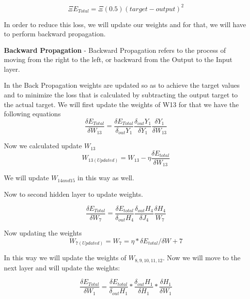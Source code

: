 \begin{equation}
\Xi E_{Total} = \Xi (0.5)(target - output)^2    
\end{equation}

In order to reduce this loss, we will update our weights and for that, we will have to perform backward propagation.

\textbf{Backward Propagation} - Backward Propagation refers to the process of moving from the right to the left, or backward from the Output to the Input layer.

In the Back Propagation weights are updated so as to achieve the target values and to minimize the loss that is calculated by subtracting the output target to the actual target. We will first update the weights of W13 for that we have the following equations
\begin{equation}
\frac{\delta E_{Total}}{\delta W_{13}} = \frac{\delta E_{Total}}{\delta_{out} Y_{1}} \frac{\delta_{out}Y_{1}}{\delta Y_{1}}  \frac{\delta Y_{1}}{\delta W_{13}}     
\end{equation}
 
Now we calculated update $W_{13}$
\begin{equation}
W_{13(Updated)} = W_{13}-\eta \frac{\delta E_{total}}{\delta W_{13}}    
\end{equation}

We will update $W_{14 and 15}$ in this way as well.

Now to second hidden layer to update weights.

\begin{equation}
    \frac{\delta E_{Total}}{\delta W_{7}} = \frac{\delta E_{total}}{\delta_{out} H_{4}} \frac{\delta_{out} H_{4}}{\delta J_{4}} \frac{\delta H_{4}}{W_{7}}
\end{equation}

Now updating the weights
\begin{equation}
    W_{7(Updated)} = W_{7} = \eta * \delta E_{total}/\delta W+{7}
\end{equation}

In this way we will update the weights of $W_{8,9,10,11,12}$. Now we will move to the next layer and will update the weights:

\begin{equation}
\frac{\delta E_{Total}}{\delta W_{1}} = \frac{\delta E_{total}}{\delta_{out}H_{1}}*\frac{\delta_{out}H_{1}}{\delta H_{1}}*\frac{\delta H_{1}}{\delta W_{1}}    
\end{equation}

